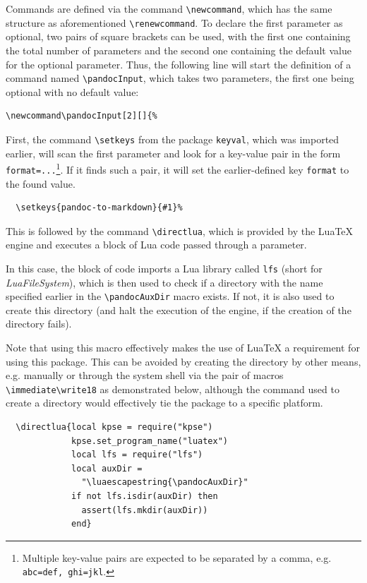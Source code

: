 \documentclass[
  digital,     %
  oneside,     %
  nosansbold,  %
  nocolorbold, %
  lof,         %
  nolot,       %
]{fithesis4}
\newcommand\macro[1]{\texttt{\textbackslash{}{#1}}}
\begin{document}
Commands are defined via the command \macro{newcommand}, which has the same structure as aforementioned \macro{renewcommand}. To declare the first parameter as optional, two pairs of square brackets can be used, with the first one containing the total number of parameters and the second one containing the default value for the optional parameter. Thus, the following line will start the definition of a command named \macro{pandocInput}, which takes two parameters, the first one being optional with no default value:

\noindent
\lstset{language=[LaTeX]TeX}
\begin{lstlisting}
\newcommand\pandocInput[2][]{%
\end{lstlisting}

\noindent
First, the command \macro{setkeys} from the package \texttt{keyval}, which was imported earlier, will scan the first parameter and look for a key-value pair in the form \texttt{format=...}\footnote{Multiple key-value pairs are expected to be separated by a comma, e.g. \texttt{abc=def,~ghi=jkl}.}. If it finds such a pair, it will set the earlier-defined key \texttt{format} to the found value.

\noindent
\lstset{language=[LaTeX]TeX}
\begin{lstlisting}
  \setkeys{pandoc-to-markdown}{#1}%
\end{lstlisting}

\noindent
This is followed by the command \macro{directlua}, which is provided by the Lua\TeX{} engine and executes a block of Lua code passed through a parameter.

In this case, the block of code imports a Lua library called \texttt{lfs} (short for \emph{LuaFileSystem}), which is then used to check if a directory with the name specified earlier in the \macro{pandocAuxDir} macro exists. If not, it is also used to create this directory (and halt the execution of the engine, if the creation of the directory fails).

Note that using this macro effectively makes the use of Lua\TeX{} a requirement for using this package. This can be avoided by creating the directory by other means, e.g. manually or through the system shell via the pair of macros \macro{immediate}\macro{write18} as demonstrated below, although the command used to create a directory would effectively tie the package to a specific platform.

\noindent
\lstset{language=[LaTeX]TeX}
\begin{lstlisting}
  \directlua{local kpse = require("kpse")
             kpse.set_program_name("luatex")
             local lfs = require("lfs")
             local auxDir =
               "\luaescapestring{\pandocAuxDir}"
             if not lfs.isdir(auxDir) then
               assert(lfs.mkdir(auxDir))
             end}
\end{lstlisting}
\end{document}
